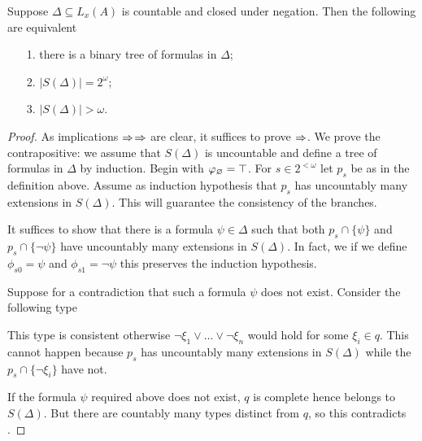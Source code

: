 \documentclass[creche.tex]{subfiles}
\begin{document}
\begin{lemma}\label{lem_bin_tree}
Suppose $\Delta\subseteq L_x(A)$ is countable and closed under negation. Then the following are equivalent\nobreak
\begin{itemize}   
\item[1.] there is a binary tree of formulas in $\Delta$;
\item[2.] $\big|S(\Delta)\big|=2^\omega$;
\item[3.] $\big|S(\Delta)\big|>\omega$.
\end{itemize}
\end{lemma}
\begin{proof}
As implications $\Rightarrow$$\Rightarrow$ are clear, it suffices to prove $\Rightarrow$. We prove the contrapositive: we assume that $S(\Delta)$ is uncountable and define a tree of formulas in $\Delta$ by induction. Begin with $\varphi_\varnothing=\top$. For $s\in 2^{<\omega}$ let $p_s$ be as in the definition above. Assume as induction hypothesis that $p_s$ has uncountably many extensions in $S(\Delta)$. This will guarantee the consistency of the branches.

It suffices to show that there is a formula $\psi\in\Delta$ such that both $p_s\cap\{\psi\}$ and $p_s\cap\{\neg\psi\}$ have uncountably many extensions in $S(\Delta)$. In fact, we if we define $\phi_{s0}=\psi$ and $\phi_{s1}=\neg\psi$ this preserves the induction hypothesis.

Suppose for a contradiction that such a formula $\psi$ does not exist. Consider the following type


This type is consistent otherwise $\neg\xi_1\vee\dots\vee\neg\xi_n$ would hold for some $\xi_i\in q$. This cannot happen because $p_s$ has uncountably many extensions in $S(\Delta)$ while the $p_s\cap\{\neg\xi_i\}$ have not.

If the formula $\psi$ required above does not exist, $q$ is complete hence belongs to $S(\Delta)$. But there are countably many types distinct from $q$, so this contradicts .
\end{proof}
\end{document}
